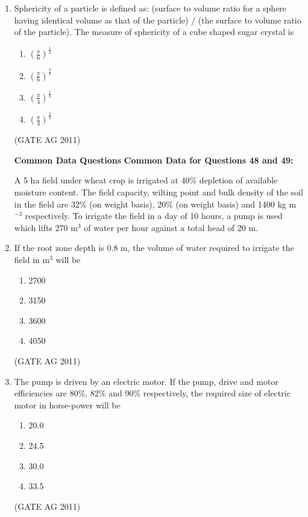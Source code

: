 \documentclass[journal,12pt,onecolumn]{IEEEtran}
\theoremstyle{remark}
\begin{document}
\begin{enumerate}
\item 
Sphericity of a particle is defined as: (surface to volume ratio for a sphere having identical volume as that of the particle) / (the surface to volume ratio of the particle). The measure of sphericity of a cube shaped sugar crystal is
\begin{multicols}{4}
\begin{enumerate}
    \item $\left( \frac{\pi}{6} \right)^{\frac13}$
    \item $\left( \frac{\pi}{6} \right)^{\frac23}$
    \item $\left( \frac{\pi}{4} \right)^{\frac13}$
    \item $\left( \frac{\pi}{4} \right)^{\frac23}$
\end{enumerate}
\end{multicols}
\hfill{(GATE AG 2011)}

\textbf{Common Data Questions}
\textbf{Common Data for Questions 48 and 49:}

A 5 ha field under wheat crop is irrigated at 40\% depletion of available moisture content. The field capacity, wilting point and bulk density of the soil in the field are 32\% (on weight basis), 20\% (on weight basis) and 1400 kg m$^{-3}$ respectively. To irrigate the field in a day of 10 hours, a pump is used which lifts 270 m$^3$ of water per hour against a total head of 20 m.

\item 
If the root zone depth is 0.8 m, the volume of water required to irrigate the field in m$^3$ will be
\begin{multicols}{4}
\begin{enumerate}
    \item 2700
    \item 3150
    \item 3600
    \item 4050
\end{enumerate}
\end{multicols}
\hfill{(GATE AG 2011)}

\item 
The pump is driven by an electric motor. If the pump, drive and motor efficiencies are 80\%, 82\% and 90\% respectively, the required size of electric motor in horse-power will be
\begin{multicols}{4}
\begin{enumerate}
    \item 20.0
    \item 24.5
    \item 30.0
    \item 33.5
\end{enumerate}
\end{multicols}
\hfill{(GATE AG 2011)}



\end{enumerate}
\end{document}
